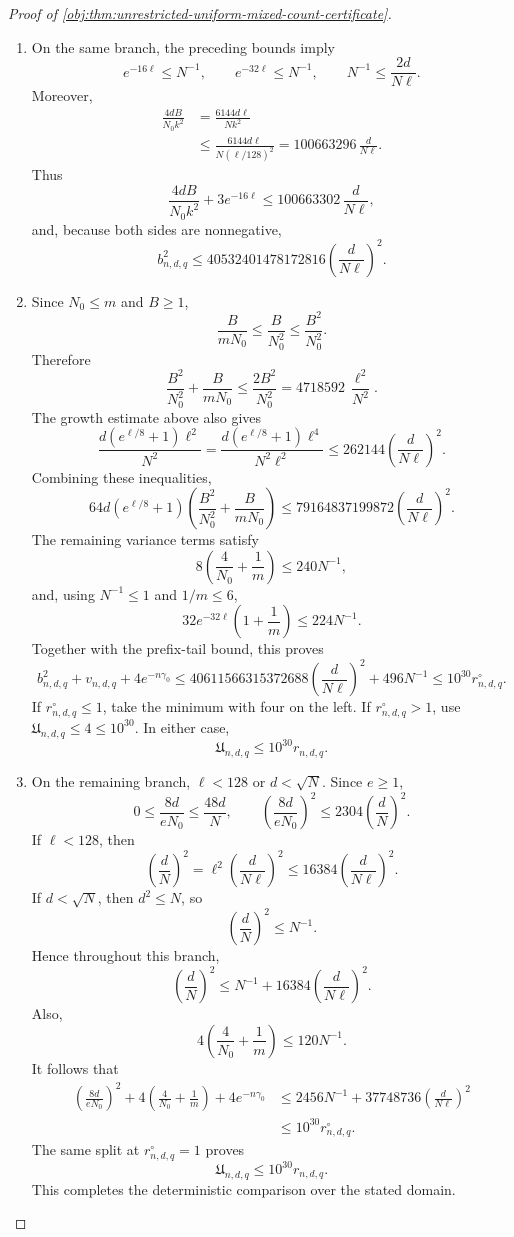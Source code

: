 \begin{proof}[Proof of \cref{obj:thm:unrestricted-uniform-mixed-count-certificate}]
\begin{enumerate}
\item On the same branch, the preceding bounds imply
\[
e^{-16\ell}\le N^{-1},
\qquad e^{-32\ell}\le N^{-1},
\qquad N^{-1}\le\frac{2d}{N\ell}.
\]
Moreover,
\[
\begin{aligned}
\frac{4dB}{N_0k^2}
&=\frac{6144d\ell}{Nk^2}\\
&\le\frac{6144d\ell}{N(\ell/128)^2}
=100663296\,\frac{d}{N\ell}.
\end{aligned}
\]
Thus
\[
\frac{4dB}{N_0k^2}+3e^{-16\ell}
\le100663302\,\frac{d}{N\ell},
\]
and, because both sides are nonnegative,
\[
b_{n,d,q}^2
\le40532401478172816
\left(\frac{d}{N\ell}\right)^2.
\]

\item Since \(N_0\le m\) and \(B\ge1\),
\[
\frac{B}{mN_0}
\le\frac{B}{N_0^2}
\le\frac{B^2}{N_0^2}.
\]
Therefore
\[
\frac{B^2}{N_0^2}+\frac{B}{mN_0}
\le\frac{2B^2}{N_0^2}
=4718592\,\frac{\ell^2}{N^2}.
\]
The growth estimate above also gives
\[
\frac{d(e^{\ell/8}+1)\ell^2}{N^2}
=
\frac{d(e^{\ell/8}+1)\ell^4}{N^2\ell^2}
\le262144\left(\frac{d}{N\ell}\right)^2.
\]
Combining these inequalities,
\[
64d(e^{\ell/8}+1)
\left(\frac{B^2}{N_0^2}+\frac{B}{mN_0}\right)
\le79164837199872
\left(\frac{d}{N\ell}\right)^2.
\]
The remaining variance terms satisfy
\[
8\left(\frac4{N_0}+\frac1m\right)\le240N^{-1},
\]
and, using \(N^{-1}\le1\) and \(1/m\le6\),
\[
32e^{-32\ell}\left(1+\frac1m\right)\le224N^{-1}.
\]
Together with the prefix-tail bound, this proves
\[
b_{n,d,q}^2+v_{n,d,q}+4e^{-n\gamma_0}
\le40611566315372688
\left(\frac{d}{N\ell}\right)^2+496N^{-1}
\le10^{30}r^\circ_{n,d,q}.
\]
If \(r^\circ_{n,d,q}\le1\), take the minimum with four on the left.
If \(r^\circ_{n,d,q}>1\), use
\(\mathfrak U_{n,d,q}\le4\le10^{30}\). In either case,
\[
\mathfrak U_{n,d,q}\le10^{30}r_{n,d,q}.
\]

\item On the remaining branch, \(\ell<128\) or \(d<\sqrt N\). Since \(e\ge1\),
\[
0\le\frac{8d}{eN_0}\le\frac{48d}{N},
\qquad
\left(\frac{8d}{eN_0}\right)^2
\le2304\left(\frac dN\right)^2.
\]
If \(\ell<128\), then
\[
\left(\frac dN\right)^2
=\ell^2\left(\frac{d}{N\ell}\right)^2
\le16384\left(\frac{d}{N\ell}\right)^2.
\]
If \(d<\sqrt N\), then \(d^2\le N\), so
\[
\left(\frac dN\right)^2\le N^{-1}.
\]
Hence throughout this branch,
\[
\left(\frac dN\right)^2
\le N^{-1}+16384\left(\frac{d}{N\ell}\right)^2.
\]
Also,
\[
4\left(\frac4{N_0}+\frac1m\right)\le120N^{-1}.
\]
It follows that
\[
\begin{aligned}
\left(\frac{8d}{eN_0}\right)^2
+4\left(\frac4{N_0}+\frac1m\right)+4e^{-n\gamma_0}
&\le2456N^{-1}
+37748736\left(\frac{d}{N\ell}\right)^2\\
&\le10^{30}r^\circ_{n,d,q}.
\end{aligned}
\]
The same split at \(r^\circ_{n,d,q}=1\) proves
\[
\mathfrak U_{n,d,q}\le10^{30}r_{n,d,q}.
\]
This completes the deterministic comparison over the stated domain.


\end{enumerate}
\end{proof}
